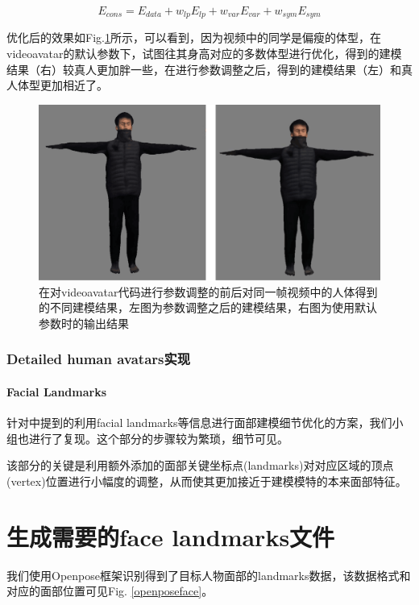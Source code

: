 \documentclass{article}
\begin{document}
\begin{equation}
	E_{cons} = E_{data} + w_{lp}E_{lp} + w_{var}E_{var} + w_{sym}E_{sym}
	\label{adjust_term}
\end{equation}

优化后的效果如Fig.\ref{adjust_compare}所示，可以看到，因为视频中的同学是偏瘦的体型，在videoavatar的默认参数下，试图往其身高对应的多数体型进行优化，得到的建模结果（右）较真人更加胖一些，在进行参数调整之后，得到的建模结果（左）和真人体型更加相近了。

\begin{figure}[H]
	\centering
	\includegraphics[width=14cm]{figure/adjust_compare.png}
	\caption{在对videoavatar代码进行参数调整的前后对同一帧视频中的人体得到的不同建模结果，左图为参数调整之后的建模结果，右图为使用默认参数时的输出结果}
	\label{adjust_compare}
\end{figure}
\subsection{Detailed human avatars实现}
\subsubsection{Facial Landmarks}
针对\cite{paper2}中提到的利用facial landmarks等信息进行面部建模细节优化的方案，我们小组也进行了复现。这个部分的步骤较为繁琐，细节可见\cite{faceoptimization}。

该部分的关键是利用额外添加的面部关键坐标点(landmarks)对对应区域的顶点(vertex)位置进行小幅度的调整，从而使其更加接近于建模模特的本来面部特征。

\chapter{生成需要的face landmarks文件}
我们使用Openpose\cite{openpose}框架识别得到了目标人物面部的landmarks数据，该数据格式和对应的面部位置可见Fig. \ref{openposeface}。
\end{document}
